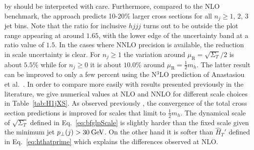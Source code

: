 by \Loopsim should be interpreted with care.
Furthermore, compared to the NLO benchmark, the \Minlo approach
predicts 10-20\% larger cross sections for all $n_j\ge 1$, $2$, $3$ jet bins.
Note that the \Minlo ratio for inclusive $hjjj$ turns out to be
outside the plot range appearing at around $1.65$, with the lower edge
of the uncertainty band at a ratio value of $1.5$.
In the cases where NNLO precision is available, the reduction in scale
uncertainty is clear. For $n_j\ge1$ the variation around
$\mu_\mathrm{R}=\sqrt{\Sigma_T}/2$ is about $5.5\%$ while for
$n_j\ge0$ it is about $10.0\%$ around $\mu_\mathrm{R}=\tfrac{1}{2}m_h$.
The latter result can be improved to only a few percent using the
N${}^3$LO prediction of Anastasiou et al.~\cite{Anastasiou:2015ema}.
In order to compare more easily with results presented previously in
the literature, we give numerical values at NLO and NNLO for different
scale choices in Table~\ref{tab:H1jXS}. As observed previously
\cite{Boughezal:2015dra}, the convergence of the total cross section predictions
is improved for scales that limit to $\tfrac{1}{2}m_h$. The dynamical
scale of $\sqrt{\Sigma_T}$ defined in Eq.~\eqref{eq:bfglpScale} is
slightly harder than the fixed scale given the minimum jet
$p_\perp(j)>30\text{\:GeV}$. On the other hand it is softer than $\hat{H}_T'$
defined in Eq.~\eqref{eq:hthatprime} which explains the differences observed at
NLO.




